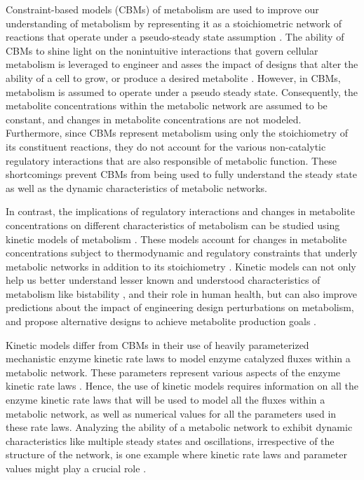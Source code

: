 \documentclass[10pt]{article}
\begin{document}
	Constraint-based models (CBMs) of metabolism are used to improve our understanding of metabolism by representing it as a stoichiometric network of reactions that operate under a pseudo-steady state assumption \parencite{Bordbar2014a}. The ability of CBMs to shine light on the nonintuitive interactions that govern cellular metabolism is leveraged to engineer and asses the impact of designs that alter the ability of a cell to grow, or produce a desired metabolite \parencite{Maia2016}. However, in CBMs, metabolism is assumed to operate under a pseudo steady state. Consequently, the metabolite concentrations within the metabolic network are assumed to be constant, and changes in metabolite concentrations are not modeled. Furthermore, since CBMs represent metabolism using only the stoichiometry of its constituent reactions, they do not account for the various non-catalytic regulatory interactions that are also responsible of metabolic function. These shortcomings prevent CBMs from being used to fully understand the steady state as well as the dynamic characteristics of metabolic networks. 
	
	In contrast, the implications of regulatory interactions and changes in metabolite concentrations on different characteristics of metabolism can be studied using kinetic models of metabolism \parencite{Saa2017}. These models account for changes in metabolite concentrations subject to thermodynamic and regulatory constraints that underly metabolic networks in addition to its stoichiometry \parencite{Link2014}. Kinetic models can not only help us better understand lesser known and understood characteristics of metabolism like bistability \parencite{Kotte2014}, and their role in human health, but can also improve predictions about the impact of engineering design perturbations on metabolism, and propose alternative designs to achieve metabolite production goals \parencite{Khodayari2016}. 
	
	Kinetic models differ from CBMs in their use of heavily parameterized mechanistic enzyme kinetic rate laws to model enzyme catalyzed fluxes within a metabolic network. These parameters represent various aspects of the enzyme kinetic rate laws \parencite{Srinivasan2015,Saa2017}. Hence, the use of kinetic models requires information on all the enzyme kinetic rate laws that will be used to model all the fluxes within a metabolic network, as well as numerical values for all the parameters used in these rate laws. Analyzing the ability of a metabolic network to exhibit dynamic characteristics like multiple steady states and oscillations, irrespective of the structure of the network, is one example where kinetic rate laws and parameter values might play a crucial role \parencite{Srinivasan2017}. 
	
\end{document}
